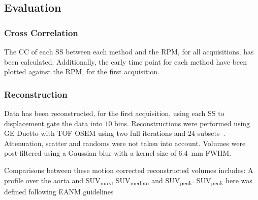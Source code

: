             \subsection{Evaluation} \label{sec:pca_data_driven_surrogate_signal_extraction_methods_for_Dynamic_pet_evaluation}
                \subsubsection{Cross Correlation} \label{sec:pca_data_driven_surrogate_signal_extraction_methods_for_Dynamic_pet_cross_correlation}
                    The \gls{CC} of each \gls{SS} between each method and the \gls{RPM}, for all acquisitions, has been calculated. Additionally, the early time point  for each method have been plotted against the \gls{RPM}, for the first acquisition.
                
                \subsubsection{Reconstruction} \label{sec:pca_data_driven_surrogate_signal_extraction_methods_for_Dynamic_pet_reconstruction}
                    Data has been reconstructed, for the first acquisition, using each \gls{SS} to displacement gate the data into $10$ bins. Reconstructions were performed using \gls{GE} Duetto with \gls{TOF} \gls{OSEM} using two full iterations and $24$ subsets~\cite{Hudson1994}.
                    Attenuation, scatter and randoms were not taken into account. Volumes were post-filtered using a Gaussian blur with a kernel size of \SI{6.4}{\milli\metre} \gls{FWHM}.
                    
                    Comparisons between these motion corrected reconstructed volumes includes: A profile over the aorta and \gls{SUV}\textsubscript{max}, \gls{SUV}\textsubscript{median} and \gls{SUV}\textsubscript{peak}. \gls{SUV}\textsubscript{peak} here was defined following \gls{EANM} guidelines~\cite{Boellaard2015FDG2.0}
            
